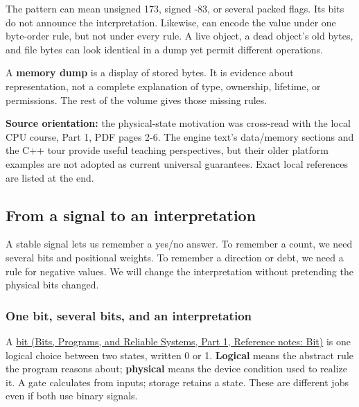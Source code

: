 The pattern  can mean unsigned 173, signed -83, or several packed flags. Its bits do not announce the interpretation. Likewise,  can encode the value  under one byte-order rule, but not under every rule. A live object, a dead object's old bytes, and file bytes can look identical in a dump yet permit different operations.

A \textbf{memory dump} is a display of stored bytes. It is evidence about representation, not a complete explanation of type, ownership, lifetime, or permissions. The rest of the volume gives those missing rules.

\textbf{Source orientation:} the physical-state motivation was cross-read with the local CPU course, Part 1, PDF pages 2-6. The engine text's data/memory sections and the C++ tour provide useful teaching perspectives, but their older platform examples are not adopted as current universal guarantees. Exact local references are listed at the end.

\subsection{From a signal to an interpretation}\label{05-engine-i-ch001-from-a-signal-to-an-interpretation}

\hypertarget{05-engine-i-ch001-from-a-signal-to-an-interpretation}{}

A stable signal lets us remember a yes/no answer. To remember a count, we need several bits and positional weights. To remember a direction or debt, we need a rule for negative values. We will change the interpretation without pretending the physical bits changed.

\subsubsection{One bit, several bits, and an interpretation}\label{05-engine-i-ch001-one-bit-several-bits-and-an-interpretation}

\hypertarget{05-engine-i-ch001-one-bit-several-bits-and-an-interpretation}{}

A \href{../01-Bits-Programs-and-Reliable-Systems-P01/main.pdf\#appendix-ddbb69998a2e}{bit (Bits, Programs, and Reliable Systems, Part 1, Reference notes: Bit)} is one logical choice between two states, written 0 or 1. \textbf{Logical} means the abstract rule the program reasons about; \textbf{physical} means the device condition used to realize it. A gate calculates from inputs; storage retains a state. These are different jobs even if both use binary signals.

